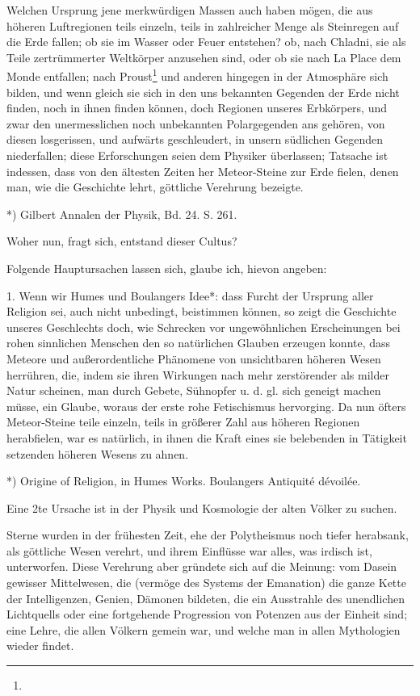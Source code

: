 \documentclass[a4paper, 11pt, oneside, polutonikogreek, german]{article}
\begin{document}
Welchen Ursprung jene merkwürdigen Massen auch haben mögen, die aus höheren Luftregionen teils einzeln, teils in zahlreicher Menge als Steinregen auf die Erde fallen; ob sie im Wasser oder Feuer entstehen? ob, nach Chladni, sie als Teile zertrümmerter Weltkörper anzusehen sind, oder ob sie nach La Place dem Monde entfallen; nach Proust\footnote{} und anderen hingegen in der Atmosphäre sich bilden, und wenn gleich sie sich in den uns bekannten Gegenden der Erde nicht finden, noch in ihnen finden können, doch Regionen unseres Erbkörpers, und zwar den unermesslichen noch unbekannten Polargegenden ans gehören, von diesen losgerissen, und aufwärts geschleudert, in unsern südlichen Gegenden niederfallen; diese Erforschungen seien dem Physiker überlassen; Tatsache ist indessen, dass von den ältesten Zeiten her Meteor-Steine zur Erde fielen, denen man, wie die Geschichte lehrt, göttliche Verehrung bezeigte.

*) Gilbert Annalen der Physik, Bd. 24. S. 261.

Woher nun, fragt sich, entstand dieser Cultus?

Folgende Hauptursachen lassen sich, glaube ich, hievon angeben:

1. Wenn wir Humes und Boulangers Idee*: dass Furcht der Ursprung aller Religion sei, auch nicht unbedingt, beistimmen können, so zeigt die Geschichte unseres Geschlechts doch, wie Schrecken vor ungewöhnlichen Erscheinungen bei rohen sinnlichen Menschen den so natürlichen Glauben erzeugen konnte, dass Meteore und außerordentliche Phänomene von unsichtbaren höheren Wesen herrühren, die, indem sie ihren Wirkungen nach mehr zerstörender als milder Natur scheinen, man durch Gebete, Sühnopfer u. d. gl. sich geneigt machen müsse, ein Glaube, woraus der erste rohe Fetischismus hervorging. Da nun öfters Meteor-Steine teile einzeln, teils in größerer Zahl aus höheren Regionen herabfielen, war es natürlich, in ihnen die Kraft eines sie belebenden in Tätigkeit setzenden höheren Wesens zu ahnen.

*) Origine of Religion, in Humes Works. Boulangers Antiquité dévoilée.

Eine 2te Ursache ist in der Physik und Kosmologie der alten Völker zu suchen.

Sterne wurden in der frühesten Zeit, ehe der Polytheismus noch tiefer herabsank, als göttliche Wesen verehrt, und ihrem Einflüsse war alles, was irdisch ist, unterworfen. Diese Verehrung aber gründete sich auf die Meinung: vom Dasein gewisser Mittelwesen, die (vermöge des Systems der Emanation) die ganze Kette der Intelligenzen, Genien, Dämonen bildeten, die ein Ausstrahle des unendlichen Lichtquells oder eine fortgehende Progression von Potenzen aus der Einheit sind; eine Lehre, die allen Völkern gemein war, und welche man in allen Mythologien wieder findet.
\end{document}
